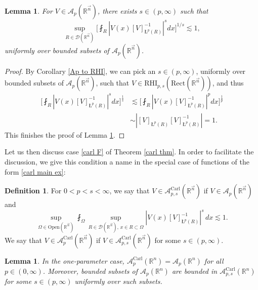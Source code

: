 \documentclass[11pt, reqno]{amsart}
\newtheorem{lemma}[theorem]{Lemma}
\theoremstyle{definition}
\newtheorem{definition}[theorem]{Definition}
\theoremstyle{remark}
\numberwithin{equation}{section}
\newcommand{\A}{\mathscr A}
\newcommand{\D}{\mathscr D}
\newcommand{\R}{\mathbb R}
\newcommand{\vn}{\vec n}
\newcommand{\aveL}{\textit{\L}}
\newcommand{\abs}[1]{|#1|}
\newcommand{\Carl}{\mathrm{Carl}}
\newcommand{\Open}{\mathrm{Open}}
\newcommand{\Rect}{\mathrm{Rect}}
\newcommand{\RHI}{\mathrm{RHI}}
\newcommand{\AC}{\A^{\Carl}}
\begin{document}
\begin{lemma}\label{Ap 2 easy carl}
For $V\in\A_p(\R^{\vn})$, there exists $s\in(p,\infty)$ such that
\begin{equation*}
\sup_{R\in\D(\R^{\vn})}\bigg[\fint_R\abs{V(x)[V]_{\aveL^p(R)}^{-1}}^s dx\bigg]^{1/s}\lesssim 1,
\end{equation*}
uniformly over bounded subsets of $\A_p(\R^{\vn})$.
\end{lemma}

\begin{proof}
By Corollary \ref{Ap to RHI}, we can pick an $s\in(p,\infty)$, uniformly over bounded subsets of $\A_p(\R^{\vn})$, such that $V\in\RHI_{p,s}(\Rect(\R^{\vn}))$, and thus
\begin{align*}
\bigg[\fint_R\abs{V(x)[V]_{\aveL^p(R)}^{-1}}^s dx\bigg]^{\frac 1s}
&\lesssim \bigg[\fint_R\abs{V(x)[V]_{\aveL^p(R)}^{-1}}^p dx\bigg]^{\frac 1p} \\
&\sim\abs{[V]_{\aveL^p(R)}[V]_{\aveL^p(R)}^{-1}}=1.
\end{align*}
This finishes the proof of Lemma \ref{Ap 2 easy carl}.
\end{proof}

Let us then discuss case \eqref{carl F} of Theorem \ref{carl thm}. In order to facilitate the discussion, we give this condition a name in the special case of functions
of the form \eqref{carl main ex}:

\begin{definition}\label{Carl prop}
For $0<p<s<\infty$, we say that $V\in\AC_{p,s}(\R^{\vn})$ if $V\in\A_p(\R^{\vn})$ and
\begin{equation}\label{carl to prove}
\sup_{\Omega\in\Open(\R^{\vn})}\fint_{\Omega}
\sup_{R\in\D(\R^{\vn}),\, x\in R\subset\Omega}
\abs{V(x)[V]_{\aveL^p(R)}^{-1}}^s \, dx\lesssim 1.
\end{equation}
We say that $V\in\AC_p(\R^{\vn})$ if $V\in\AC_{p,s}(\R^{\vn})$ for some $s\in(p,\infty)$.
\end{definition}

\begin{lemma}\label{Carl prop 1}
In the one-parameter case, $\AC_p(\R^n)=\A_p(\R^n)$ for all $p\in(0,\infty)$. Moreover, bounded subsets of $\A_p(\R^n)$ are bounded in $\AC_{p,s}(\R^n)$ for some $s\in(p,\infty)$ uniformly over such subsets.
\end{lemma}
\end{document}
